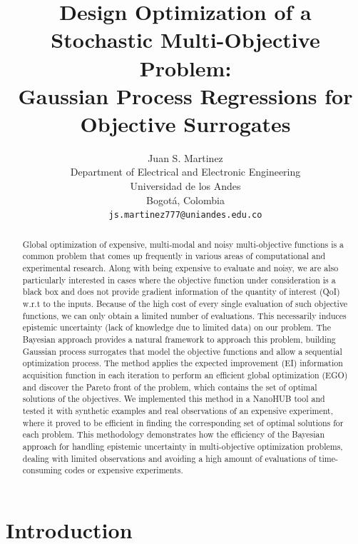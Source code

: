 \documentclass{article}
\title{Design Optimization of a Stochastic Multi-Objective Problem: \\Gaussian Process Regressions for Objective Surrogates}
\author{
  Juan S. Martinez\\
  Department of Electrical and Electronic Engineering\\
  Universidad de los Andes\\
  Bogotá, Colombia \\
  \texttt{js.martinez777@uniandes.edu.co} \\
}
\begin{document}

\maketitle

\begin{abstract}
    Global optimization of expensive, multi-modal and noisy multi-objective functions is a common problem that comes up frequently in various areas of computational and experimental research. Along with being expensive to evaluate and noisy, we are also particularly interested in cases where the objective function under consideration is a black box and does not provide gradient information of the quantity of interest (QoI) w.r.t to the inputs. Because of the high cost of every single evaluation of such objective functions, we can only obtain a limited number of evaluations. This necessarily induces epistemic uncertainty (lack of knowledge due to limited data) on our problem. The Bayesian approach provides a natural framework to approach this problem, building Gaussian process surrogates that model the objective functions and allow a sequential optimization process. The method applies the expected improvement (EI) information acquisition function in each iteration to perform an efficient global optimization (EGO) and discover the Pareto front of the problem, which contains the set of optimal solutions of the objectives. We implemented this method in a NanoHUB tool and tested it with synthetic examples and real observations of an expensive experiment, where it proved to be efficient in finding the corresponding set of optimal solutions for each problem. This methodology demonstrates how the efficiency of the Bayesian approach for handling epistemic uncertainty in multi-objective optimization problems, dealing with limited observations and avoiding a high amount of evaluations of time-consuming codes or expensive experiments.
\end{abstract}

\section{Introduction}
\end{document}
